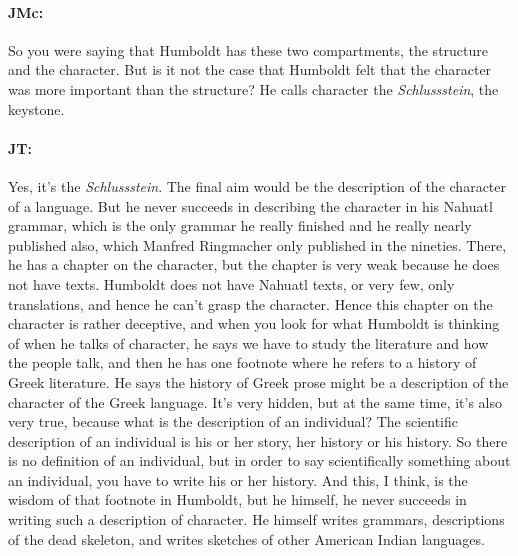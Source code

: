 \documentclass[output=paper]{langscibook}
\begin{document}
\paragraph*{JMc:} So you were saying that Humboldt has these two compartments, the structure and the character. But is it not the case that Humboldt felt that the character was more important than the structure? He calls character the \textit{Schlussstein}, the keystone.


\paragraph*{JT:} Yes, it’s the \textit{Schlussstein}. The final aim would be the description of the character of a language. But he never succeeds in describing the character in his Nahuatl grammar, which is the only grammar he really finished and he really nearly published also, which Manfred Ringmacher only published in the nineties. There, he has a chapter on the character, but the chapter is very weak because he does not have texts. Humboldt does not have Nahuatl texts, or very few, only translations, and hence he can’t grasp the character. Hence this chapter on the character is rather deceptive, and when you look for what Humboldt is thinking of when he talks of character, he says we have to study the literature and how the people talk, and then he has one footnote where he refers to a history of Greek literature. He says the history of Greek prose  might be a description of the character of the Greek language. It’s very hidden, but at the same time, it’s also very true, because what is the description of an individual? The scientific description of an individual is his or her story, her history or his history. So there is no definition of an individual, but in order to say scientifically something about an individual, you have to write his or her history. And this, I think, is the wisdom of that footnote in Humboldt, but he himself, he never succeeds in writing such a description of character. He himself writes grammars, descriptions of the dead skeleton, and writes sketches of other American Indian languages.
\end{document}
